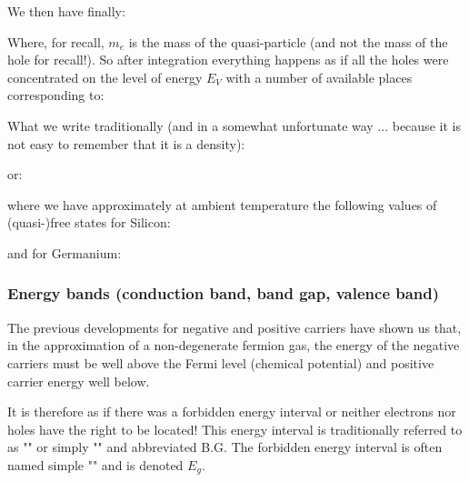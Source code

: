 	We then have finally:
	
	Where, for recall, $m_e$ is the mass of the quasi-particle (and not the mass of the hole for recall!). So after integration everything happens as if all the holes were concentrated on the level of energy $E_V$ with a number of available places corresponding to:
	
	What we write traditionally (and in a somewhat unfortunate way ... because it is not easy to remember that it is a density):
	
	or:
	
	where we have approximately at ambient temperature the following values of (quasi-)free states for Silicon:
	
	and for Germanium:
	
	
	\subsubsection{Energy bands (conduction band, band gap, valence band)}
	The previous developments for negative and positive carriers have shown us that, in the approximation of a non-degenerate fermion gas, the energy of the negative carriers must be well above the Fermi level (chemical potential) and positive carrier energy well below.

	It is therefore as if there was a forbidden energy interval or neither electrons nor holes have the right to be located! This energy interval is traditionally referred to as "" or simply "" and abbreviated B.G. The forbidden energy interval is often named simple "" and is denoted $E_g$.


